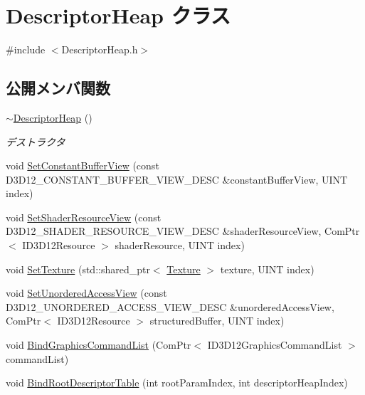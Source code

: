 \hypertarget{class_descriptor_heap}{}\section{Descriptor\+Heap クラス}
\label{class_descriptor_heap}


{\ttfamily \#include $<$Descriptor\+Heap.\+h$>$}

\subsection*{公開メンバ関数}
\begin{DoxyCompactItemize}
\item 
\mbox{\hyperlink{class_descriptor_heap_a784aaaafaa338085c029c29d97f802c0}{$\sim$\+Descriptor\+Heap}} ()
\begin{DoxyCompactList}\small\item\em デストラクタ \end{DoxyCompactList}\item 
void \mbox{\hyperlink{class_descriptor_heap_ad95a0a669e09aa11972c2a3a6a880ab4}{Set\+Constant\+Buffer\+View}} (const D3\+D12\+\_\+\+C\+O\+N\+S\+T\+A\+N\+T\+\_\+\+B\+U\+F\+F\+E\+R\+\_\+\+V\+I\+E\+W\+\_\+\+D\+E\+SC \&constant\+Buffer\+View, U\+I\+NT index)
\item 
void \mbox{\hyperlink{class_descriptor_heap_ab3cb1e5126b26f903065ac3348aa833e}{Set\+Shader\+Resource\+View}} (const D3\+D12\+\_\+\+S\+H\+A\+D\+E\+R\+\_\+\+R\+E\+S\+O\+U\+R\+C\+E\+\_\+\+V\+I\+E\+W\+\_\+\+D\+E\+SC \&shader\+Resource\+View, Com\+Ptr$<$ I\+D3\+D12\+Resource $>$ shader\+Resource, U\+I\+NT index)
\item 
void \mbox{\hyperlink{class_descriptor_heap_ae200d9d61adca929e3549694a2247bd2}{Set\+Texture}} (std\+::shared\+\_\+ptr$<$ \mbox{\hyperlink{class_texture}{Texture}} $>$ texture, U\+I\+NT index)
\item 
void \mbox{\hyperlink{class_descriptor_heap_ac3d8cd7c54b652dffec68df29e488f0e}{Set\+Unordered\+Access\+View}} (const D3\+D12\+\_\+\+U\+N\+O\+R\+D\+E\+R\+E\+D\+\_\+\+A\+C\+C\+E\+S\+S\+\_\+\+V\+I\+E\+W\+\_\+\+D\+E\+SC \&unordered\+Access\+View, Com\+Ptr$<$ I\+D3\+D12\+Resource $>$ structured\+Buffer, U\+I\+NT index)
\item 
void \mbox{\hyperlink{class_descriptor_heap_ad4c58082394b6dedc4f6eaaed9b2da1c}{Bind\+Graphics\+Command\+List}} (Com\+Ptr$<$ I\+D3\+D12\+Graphics\+Command\+List $>$ command\+List)
\item 
void \mbox{\hyperlink{class_descriptor_heap_a8580bf420ca41fd262793680d5676524}{Bind\+Root\+Descriptor\+Table}} (int root\+Param\+Index, int descriptor\+Heap\+Index)
\end{DoxyCompactItemize}
